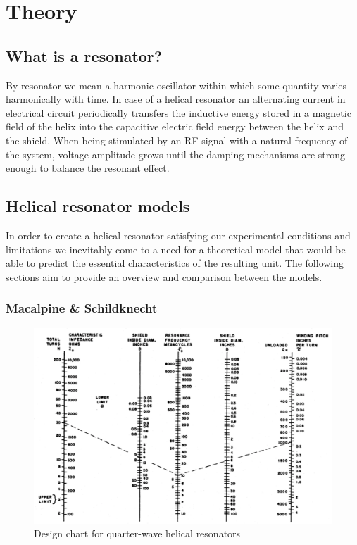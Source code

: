 \chapter{Theory}
\section{What is a resonator?}
By resonator we mean a harmonic oscillator within which some quantity varies harmonically with time. In case of a helical resonator an alternating current in electrical circuit periodically transfers the inductive energy stored in a magnetic field of the helix into the capacitive electric field energy between the helix and the shield. When being stimulated by an RF signal with a natural frequency of the system, voltage amplitude grows until the damping mechanisms are strong enough to balance the resonant effect.

\section{Helical resonator models}
In order to create a helical resonator satisfying our experimental conditions and limitations we inevitably come to a need for a theoretical model that would be able to predict the essential characteristics of the resulting unit. The following sections aim to provide an overview and comparison between the models.

\subsection{Macalpine \& Schildknecht}
\begin{figure}[h!]
	\centering
	\includegraphics[width=.99\textwidth]{images/macalpine_chart}
	\caption{Design chart for quarter-wave helical resonators \cite{Macalpine2000}}
	\label{fig:macalpine_chart}
\end{figure}

